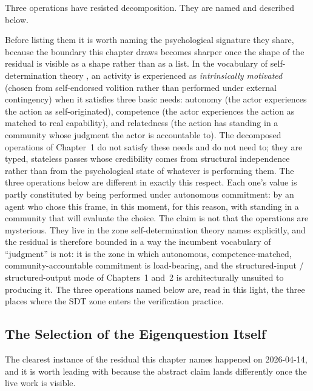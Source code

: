 \documentclass[11pt]{article}
\begin{document}
Three operations have resisted decomposition. They are named and described below.

Before listing them it is worth naming the psychological signature they share, because the boundary this chapter draws becomes sharper once the shape of the residual is visible as a shape rather than as a list. In the vocabulary of self-determination theory \citep{ryan2000}, an activity is experienced as \emph{intrinsically motivated} (chosen from self-endorsed volition rather than performed under external contingency) when it satisfies three basic needs: autonomy (the actor experiences the action as self-originated), competence (the actor experiences the action as matched to real capability), and relatedness (the action has standing in a community whose judgment the actor is accountable to). The decomposed operations of Chapter~1 do not satisfy these needs and do not need to; they are typed, stateless passes whose credibility comes from structural independence rather than from the psychological state of whatever is performing them. The three operations below are different in exactly this respect. Each one's value is partly constituted by being performed under autonomous commitment: by an agent who chose this frame, in this moment, for this reason, with standing in a community that will evaluate the choice. The claim is not that the operations are mysterious. They live in the zone self-determination theory names explicitly, and the residual is therefore bounded in a way the incumbent vocabulary of ``judgment'' is not: it is the zone in which autonomous, competence-matched, community-accountable commitment is load-bearing, and the structured-input / structured-output mode of Chapters~1 and~2 is architecturally unsuited to producing it. The three operations named below are, read in this light, the three places where the SDT zone enters the verification practice.

\subsection{The Selection of the Eigenquestion Itself}

The clearest instance of the residual this chapter names happened on 2026-04-14, and it is worth leading with because the abstract claim lands differently once the live work is visible.
\end{document}
